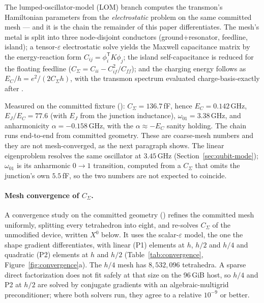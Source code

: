 \documentclass{anvil-paper}
\begin{document}
The lumped-oscillator-model (LOM) branch computes the transmon's
Hamiltonian parameters from the \emph{electrostatic} problem on the same
committed mesh --- and it is the chain the remainder of this paper
differentiates. The mesh's metal is split into three node-disjoint
conductors (ground+resonator, feedline, island); a tensor-$\varepsilon$
electrostatic solve yields the Maxwell capacitance matrix by the
energy-reaction form $C_{ij} = \phi_i^{\mathsf{T}} K \phi_j$; the island
self-capacitance is reduced for the floating feedline
($C_\Sigma = C_{ii} - C_{if}^2/C_{ff}$); and the charging energy follows
as $E_C/h = e^2/(2 C_\Sigma h)$, with the transmon spectrum evaluated
charge-basis-exactly after \citet{koch2007}.

Measured on the committed fixture
(): $C_\Sigma =
136.7$\,fF, hence $E_C = 0.142$\,GHz, $E_J/E_C = 77.6$ (with $E_J$ from
the junction inductance), $\omega_{01} = 3.38$\,GHz, and anharmonicity
$\alpha = -0.158$\,GHz, with the $\alpha \approx -E_C$ sanity holding.
The chain runs end-to-end from committed geometry. These are
coarse-mesh numbers and they are not mesh-converged, as the next
paragraph shows. The linear eigenproblem
resolves the same oscillator at $3.45$\,GHz
(Section~\ref{sec:qubit-mode}); $\omega_{01}$ is its anharmonic
$0 \to 1$ transition, computed from a $C_\Sigma$ that omits the
junction's own $5.5$\,fF, so the two numbers are not expected to
coincide.

\paragraph{Mesh convergence of $C_\Sigma$.}
A convergence study on the committed geometry
() refines
the committed mesh uniformly, splitting every tetrahedron into eight,
and re-solves $C_\Sigma$ of the unmodified device, written $X^0$ below.
It uses the scalar-$\varepsilon$ model, the one the shape gradient
differentiates, with linear (P1) elements at $h$, $h/2$ and $h/4$ and
quadratic (P2) elements at $h$ and $h/2$
(Table~\ref{tab:convergence}, Figure~\ref{fig:convergence}a). The $h/4$
mesh has $8{,}532{,}096$ tetrahedra. A sparse direct factorization does
not fit safely at that size on the 96\,GiB host, so $h/4$ and P2 at
$h/2$ are solved by conjugate gradients with an algebraic-multigrid
preconditioner; where both solvers run, they agree to a relative
$10^{-9}$ or better.
\end{document}
